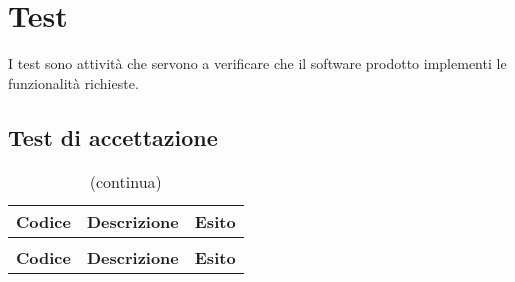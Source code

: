 \section{Test}
I test sono attività che servono a verificare che il software prodotto implementi le funzionalità richieste.
\subsection{Test di accettazione} 
	\renewcommand{\arraystretch}{1.5}
	
	\begin{longtable}{ >{\centering}p{} >{}p{}
			>{\centering}p{}}%
			
		\caption{Riepilogo Test di Accettazione}\\	
		\rowcolorhead
		\textbf{\color{white}Codice} 
		& \centering\textbf{\color{white}Descrizione} 
		& \centering\textbf{\color{white}Esito}
		\tabularnewline %
		\endfirsthead	
		
		\rowcolor{white}\caption[]{(continua)}\\	
		\rowcolorhead
		\textbf{\color{white}Codice} 
		& \centering\textbf{\centering\color{white}Descrizione} 
		& \centering\textbf{\color{white}Esito}
		\tabularnewline %
		\endhead	
		

\end{longtable}
